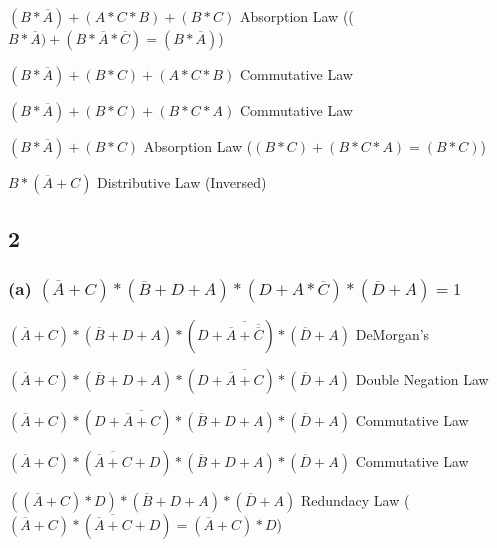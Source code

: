 \documentclass{article}
\newcommand{\boxedanswer}[1]{%

    \fbox{\large\textbf{#1}}%
}
\begin{document}
    $(B*\overline{A}) + (A*C*B) + (B*C)$ \hspace*{0.1in} Absorption Law (($B*\overline{A})+ (B*\overline{A}*\overline{C}) = (B*\overline{A})$)

    $(B*\overline{A}) + (B*C) + (A*C*B)$ \hspace*{0.1in} Commutative Law

    $(B*\overline{A}) + (B*C) + (B*C*A)$ \hspace*{0.1in} Commutative Law

    $(B*\overline{A}) + (B*C)$ \hspace*{0.1in} Absorption Law ($(B*C) + (B*C*A) = (B*C)$)

    $B*(\overline{A}+C)$ Distributive Law (Inversed)

    \vspace*{0.1in}

    \boxedanswer{$B*(\overline{A}+C)$}

    \newpage

    \subsection*{2}

    \subsubsection*{(a) $(\overline{A} + C) * (\overline{B} + D + A) * (D + A * \overline{C}) * (\overline{D} + A) = 1$}

    $(\overline{A} + C) * (\overline{B} + D + A) * (D + \overline{\overline{A} + \overline{\overline{C}}}) * (\overline{D} + A)$ \hspace*{0.1in} DeMorgan's

    $(\overline{A} + C) * (\overline{B} + D + A) * (D + \overline{\overline{A} + C}) * (\overline{D} + A)$ \hspace*{0.1in} Double Negation Law

    $(\overline{A} + C) * (D + \overline{\overline{A} + C}) * (\overline{B} + D + A) * (\overline{D} + A)$ \hspace*{0.1in} Commutative Law

    $(\overline{A} + C) * (\overline{\overline{A} + C} + D) * (\overline{B} + D + A) * (\overline{D} + A)$ \hspace*{0.1in} Commutative Law

    $((\overline{A} + C) * D) * (\overline{B} + D + A) * (\overline{D} + A)$ \hspace*{0.1in} Redundacy Law ($(\overline{A} + C) * (\overline{\overline{A} + C} + D) = (\overline{A} + C) * D $)
\end{document}
